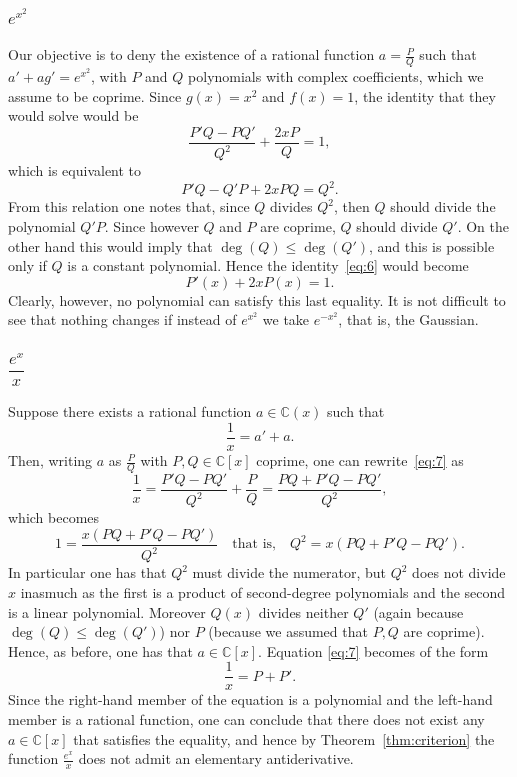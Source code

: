 \documentclass[11pt]{article}
\theoremstyle{plain}
\theoremstyle{definition}
\theoremstyle{remark}
\newcommand{\C}{\mathbb{C}}
\renewcommand{\deg}{\operatorname{deg}}
\begin{document}
\subsubsection*{$e^{x^{2}}$}
Our objective is to deny the existence of a rational function
$a = \frac{P}{Q}$ such that $a' + a g' = e^{x^{2}}$, with $P$ and $Q$
polynomials with complex coefficients, which we assume to be coprime.
Since $g(x) = x^{2}$ and $f(x) = 1$, the identity that they would solve
would be
\[
\frac{P'Q - PQ'}{Q^{2}} + \frac{2xP}{Q} = 1,
\]
which is equivalent to
\begin{equation}\label{eq:6}
P'Q - Q'P + 2xPQ = Q^{2}.
\end{equation}
From this relation one notes that, since $Q$ divides $Q^{2}$, then $Q$
should divide the polynomial $Q'P$. Since however $Q$ and $P$ are
coprime, $Q$ should divide $Q'$. On the other hand this would imply
that $\deg(Q) \le \deg(Q')$, and this is possible only if $Q$ is a
constant polynomial. Hence the identity~\eqref{eq:6} would become
\[
P'(x) + 2xP(x) = 1.
\]
Clearly, however, no polynomial can satisfy this last equality. It is
not difficult to see that nothing changes if instead of $e^{x^{2}}$ we
take $e^{-x^{2}}$, that is, the Gaussian.

\subsubsection*{$\dfrac{e^{x}}{x}$}
Suppose there exists a rational function $a \in \C(x)$ such that
\begin{equation}\label{eq:7}
\frac{1}{x} = a' + a.
\end{equation}
Then, writing $a$ as $\frac{P}{Q}$ with $P, Q \in \C[x]$ coprime, one
can rewrite~\eqref{eq:7} as
\[
\frac{1}{x} = \frac{P'Q - PQ'}{Q^{2}} + \frac{P}{Q}
= \frac{PQ + P'Q - PQ'}{Q^{2}},
\]
which becomes
\[
1 = \frac{x(PQ + P'Q - PQ')}{Q^{2}}
\quad\text{that is,}\quad
Q^{2} = x(PQ + P'Q - PQ').
\]
In particular one has that $Q^{2}$ must divide the numerator, but
$Q^{2}$ does not divide $x$ inasmuch as the first is a product of
second-degree polynomials and the second is a linear polynomial.
Moreover $Q(x)$ divides neither $Q'$ (again because
$\deg(Q) \le \deg(Q')$) nor $P$ (because we assumed that $P, Q$ are
coprime). Hence, as before, one has that $a \in \C[x]$. Equation
\eqref{eq:7} becomes of the form
\[
\frac{1}{x} = P + P'.
\]
Since the right-hand member of the equation is a polynomial and the
left-hand member is a rational function, one can conclude that there
does not exist any $a \in \C[x]$ that satisfies the equality, and hence
by Theorem~\ref{thm:criterion} the function $\frac{e^{x}}{x}$ does not
admit an elementary antiderivative.
\end{document}
